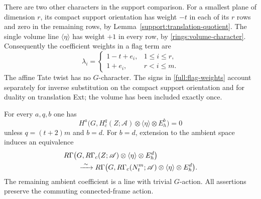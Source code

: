 There are two other characters in the support comparison.
For a smallest plane of dimension $r$, its compact support orientation
has weight $-t$ in each of its $r$ rows and zero in the remaining
rows, by Lemma~\ref{support:translation-quotient}.
The single volume line $\langle\eta\rangle$ has weight $+1$
in every row, by \eqref{rings:volume-character}.
Consequently the coefficient weights in a flag term are
\begin{equation}
\label{full:flag-weights}
 \lambda_i=
 \begin{cases}
  1-t+e_i,&1\leq i\leq r,\\
  1+e_i,&r<i\leq m.
 \end{cases}
\end{equation}
The affine Tate twist has no $G$-character.  The signs in
\eqref{full:flag-weights} account separately for inverse substitution
on the compact support orientation and for duality on translation
Ext; the volume has been included exactly once.

\begin{lemma}
\label{lem:weight-vanishing}
For every $a,q,b$ one has
\begin{equation}
\label{full:weight-vanishing}
 H^a\bigl(G,H_c^q(Z;\mathscr A)\otimes
               \langle\eta\rangle\otimes E_h^b\bigr)=0
\end{equation}
unless $q=(t+2)m$ and $b=d$.
For $b=d$, extension to the ambient space induces an equivalence
\begin{equation}
\label{full:ambient-edge}
 \begin{aligned}
 &R\Gamma\bigl(G,R\Gamma_c(Z;\mathscr A)\otimes
                    \langle\eta\rangle\otimes E_h^d\bigr)\\
 &\qquad\xrightarrow{\ \sim\ }
 R\Gamma\bigl(G,R\Gamma_c(N_t^m;\mathscr A)\otimes
                    \langle\eta\rangle\otimes E_h^d\bigr).
 \end{aligned}
\end{equation}
The remaining ambient coefficient is a line with trivial $G$-action.
All assertions preserve the commuting connected-frame action.
\end{lemma}

